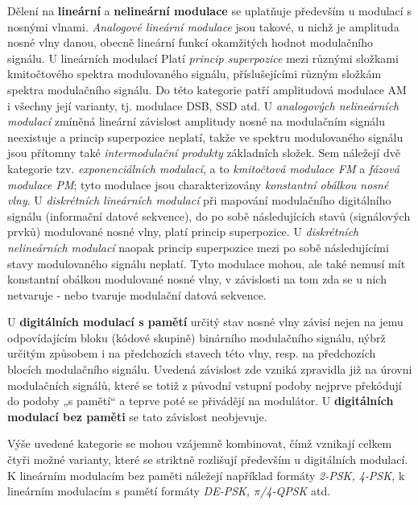      Dělení na \textbf{lineární} a \textbf{nelineární modulace} se uplatňuje především u modulací s nosnými 
      vlnami. \emph{Analogové lineární modulace} jsou takové, u nichž je amplituda nosné vlny danou, obecně 
      lineární funkcí okamžitých hodnot modulačního signálu. U lineárních modulací Platí \emph{princip 
      superpozice} mezi různými složkami kmitočtového spektra modulovaného signálu, příslušejícími různým 
      složkám spektra modulačního signálu. Do této kategorie patří amplitudová modulace AM i všechny její 
      varianty, tj. modulace DSB, SSD atd. U \emph{analogových nelineárních modulací} zmíněná lineární 
      závislost amplitudy nosné na modulačním signálu neexistuje a princip superpozice neplatí, takže ve 
      spektru modulovaného signálu jsou přítomny také \emph{intermodulační produkty} základních složek. Sem 
      náležejí dvě kategorie tzv. \emph{exponenciálních modulací}, a to \emph{kmitočtová modulace FM} a 
      \emph{fázová modulace PM}; tyto modulace jsou charakterizovány \emph{konstantní obálkou nosné vlny}.
      U \emph{diskrétních lineárních modulací} při mapování modulačního digitálního signálu (informační 
      datové sekvence), do po sobě následujících stavů (signálových prvků) modulované nosné vlny, platí 
      princip superpozice. U \emph{diskrétních nelineárních modulací} naopak princip superpozice mezi po sobě 
      následujícími stavy modulovaného signálu neplatí. Tyto modulace mohou, ale také nemusí mít konstantní 
      obálkou modulované nosné vlny, v závislosti na tom zda se u nich netvaruje - nebo tvaruje modulační 
      datová sekvence.
      
      U \textbf{digitálních modulací s pamětí} určitý stav nosné vlny závisí nejen na jemu odpovídajícím 
      bloku (kódové skupině) binárního modulačního signálu, nýbrž určitým způsobem i na předchozích stavech 
      této vlny, resp. na předchozích blocích modulačního signálu. Uvedená závislost zde vzniká zpravidla již 
      na úrovni modulačních signálů, které se totiž z původní vstupní podoby nejprve překódují do podoby „s 
      pamětí“ a teprve poté se přivádějí na modulátor. U \textbf{digitálních modulací bez paměti} se tato 
      závislost neobjevuje.
      
      Výše uvedené kategorie se mohou vzájemně kombinovat, čímž vznikají celkem čtyři možné varianty, které 
      se striktně rozlišují především u digitálních modulací. K lineárním modulacím bez paměti náležejí 
      například formáty \emph{2-PSK, 4-PSK,} k lineárním modulacím s pamětí formáty \emph{DE-PSK, 
      \(\pi\)/4-QPSK} atd. 
      
